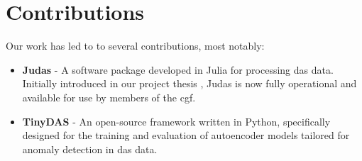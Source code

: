 \section{Contributions}

Our work has led to to several contributions, most notably:

\begin{itemize}
    \item \textbf{Judas} - A software package developed in Julia for processing \acrshort{das} data. Initially introduced in our project thesis \cite{projthesis}, Judas is now fully operational and available for use by members of the \acrshort{cgf}.
    \item \textbf{TinyDAS} -  An open-source framework written in Python, specifically designed for the training and evaluation of autoencoder models tailored for anomaly detection in \acrshort{das} data.
\end{itemize}